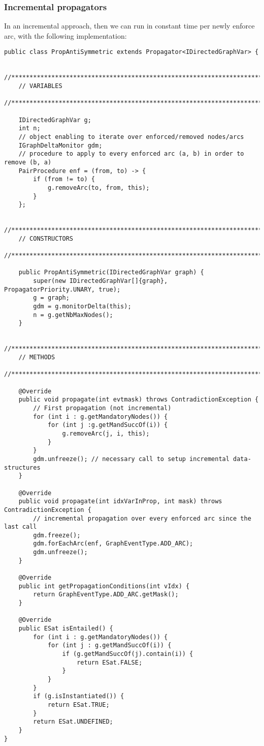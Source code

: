 \documentclass{article}
\begin{document}
\subsubsection{Incremental propagators}

In an incremental approach, then we can run in constant time per newly enforce arc, with the following implementation:
\begin{lstlisting}
public class PropAntiSymmetric extends Propagator<IDirectedGraphVar> {

    //***********************************************************************
    // VARIABLES
    //***********************************************************************

    IDirectedGraphVar g;
    int n;
    // object enabling to iterate over enforced/removed nodes/arcs
    IGraphDeltaMonitor gdm;
    // procedure to apply to every enforced arc (a, b) in order to remove (b, a)
    PairProcedure enf = (from, to) -> {
        if (from != to) {
            g.removeArc(to, from, this);
        }
    };

    //***********************************************************************
    // CONSTRUCTORS
    //***********************************************************************

    public PropAntiSymmetric(IDirectedGraphVar graph) {
        super(new IDirectedGraphVar[]{graph}, PropagatorPriority.UNARY, true);
        g = graph;
        gdm = g.monitorDelta(this);
        n = g.getNbMaxNodes();
    }

    //***********************************************************************
    // METHODS
    //***********************************************************************

    @Override
    public void propagate(int evtmask) throws ContradictionException {
        // First propagation (not incremental)
        for (int i : g.getMandatoryNodes()) {
            for (int j :g.getMandSuccOf(i)) {
                g.removeArc(j, i, this);
            }
        }
        gdm.unfreeze(); // necessary call to setup incremental data-structures
    }

    @Override
    public void propagate(int idxVarInProp, int mask) throws ContradictionException {
        // incremental propagation over every enforced arc since the last call
        gdm.freeze();
        gdm.forEachArc(enf, GraphEventType.ADD_ARC);
        gdm.unfreeze();
    }

    @Override
    public int getPropagationConditions(int vIdx) {
        return GraphEventType.ADD_ARC.getMask();
    }

    @Override
    public ESat isEntailed() {
        for (int i : g.getMandatoryNodes()) {
            for (int j : g.getMandSuccOf(i)) {
                if (g.getMandSuccOf(j).contain(i)) {
                    return ESat.FALSE;
                }
            }
        }
        if (g.isInstantiated()) {
            return ESat.TRUE;
        }
        return ESat.UNDEFINED;
    }
}
\end{lstlisting}
\end{document}
